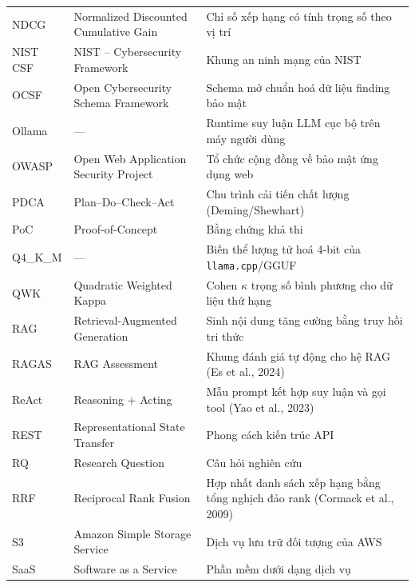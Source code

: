 \begin{longtable}{p{2.2cm} p{5.6cm} p{6.4cm}}
  NDCG    & Normalized Discounted Cumulative Gain                     & Chỉ số xếp hạng có tính trọng số theo vị trí \\
  NIST CSF & NIST -- Cybersecurity Framework                          & Khung an ninh mạng của NIST \\
  OCSF    & Open Cybersecurity Schema Framework                       & Schema mở chuẩn hoá dữ liệu finding bảo mật \\
  Ollama  & ---                                                       & Runtime suy luận LLM cục bộ trên máy người dùng \\
  OWASP   & Open Web Application Security Project                     & Tổ chức cộng đồng về bảo mật ứng dụng web \\
  PDCA    & Plan--Do--Check--Act                                      & Chu trình cải tiến chất lượng (Deming/Shewhart) \\
  PoC     & Proof-of-Concept                                          & Bằng chứng khả thi \\
  Q4\_K\_M & ---                                                      & Biến thể lượng tử hoá 4-bit của \texttt{llama.cpp}/GGUF \\
  QWK     & Quadratic Weighted Kappa                                  & Cohen $\kappa$ trọng số bình phương cho dữ liệu thứ hạng \\
  RAG     & Retrieval-Augmented Generation                            & Sinh nội dung tăng cường bằng truy hồi tri thức \\
  RAGAS   & RAG Assessment                                            & Khung đánh giá tự động cho hệ RAG (Es et al., 2024) \\
  ReAct   & Reasoning + Acting                                        & Mẫu prompt kết hợp suy luận và gọi tool (Yao et al., 2023) \\
  REST    & Representational State Transfer                           & Phong cách kiến trúc API \\
  RQ      & Research Question                                         & Câu hỏi nghiên cứu \\
  RRF     & Reciprocal Rank Fusion                                    & Hợp nhất danh sách xếp hạng bằng tổng nghịch đảo rank (Cormack et al., 2009) \\
  S3      & Amazon Simple Storage Service                             & Dịch vụ lưu trữ đối tượng của AWS \\
  SaaS    & Software as a Service                                     & Phần mềm dưới dạng dịch vụ \\

\end{longtable}
